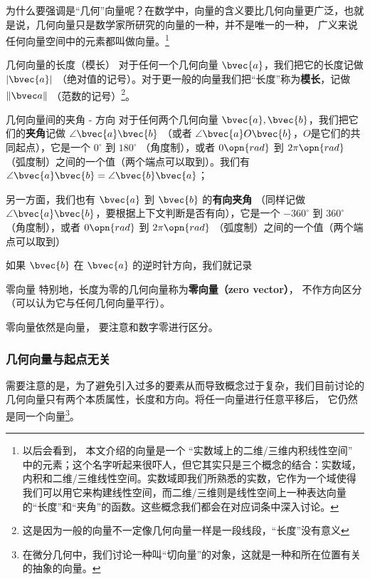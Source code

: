 为什么要强调是“几何”向量呢？在数学中，向量的含义要比几何向量更广泛，也就是说，几何向量只是数学家所研究的向量的一种，并不是唯一的一种， 广义来说任何向量空间中的元素都叫做向量。\footnote{以后会看到， 本文介绍的向量是一个 “实数域上的二维/三维内积线性空间” 中的元素；这个名字听起来很吓人，但它其实只是三个概念的结合：实数域，内积和二维/三维线性空间。实数域即我们所熟悉的实数，它作为一个域使得我们可以用它来构建线性空间，而二维/三维则是线性空间上一种表达向量的“长度”和“夹角”的函数。这些概念我们都会在对应词条中深入讨论。}

\begin{definition}{几何向量的长度（模长）}
对于任何一个几何向量 $\bvec{a}$，我们把它的长度记做 $|\bvec{a}|$ （绝对值的记号）。对于更一般的向量我们把“长度”称为\textbf{模长}，记做 $\|\bvec a\|$ （范数的记号）\footnote{这是因为一般的向量不一定像几何向量一样是一段线段，“长度”没有意义}。
\end{definition}


\begin{definition}{几何向量间的夹角 - 方向}
对于任何两个几何向量 $\bvec{a}, \bvec{b}$，我们把它们的\textbf{夹角}记做 $\angle \bvec{a} \bvec{b}$ （或者 $\angle \bvec{a} O \bvec{b}$，$O$是它们的共同起点），它是一个 $0^{\circ}$ 到 $180^{\circ}$ （角度制），或者 $0 \opn{rad}$ 到 $2 \pi \opn{rad}$ （弧度制）之间的一个值（两个端点可以取到）。我们有 $\angle \bvec{a} \bvec{b} = \angle \bvec{b} \bvec{a}$；

另一方面，我们也有 $\bvec{a}$ 到 $\bvec{b}$ 的\textbf{有向夹角} （同样记做 $\angle \bvec{a} \bvec{b}$，要根据上下文判断是否有向），它是一个 $-360^{\circ}$ 到 $360^{\circ}$ （角度制），或者 $0 \opn{rad}$ 到 $2 \pi \opn{rad}$ （弧度制）之间的一个值（两个端点可以取到）

如果 $\bvec{b}$ 在 $\bvec{a}$ 的逆时针方向，我们就记录
\end{definition}


\begin{definition}{零向量}
特别地，长度为零的几何向量称为\textbf{零向量（zero vector）}， 不作方向区分（可以认为它与任何几何向量平行）。
\end{definition}
零向量依然是向量， 要注意和数字零进行区分。

\subsubsection{几何向量与起点无关}
需要注意的是，为了避免引入过多的要素从而导致概念过于复杂，我们目前讨论的几何向量只有两个本质属性，长度和方向。将任一向量进行任意平移后， 它仍然是同一个向量\footnote{在微分几何中，我们讨论一种叫“切向量”的对象，这就是一种和所在位置有关的抽象的向量。}。

